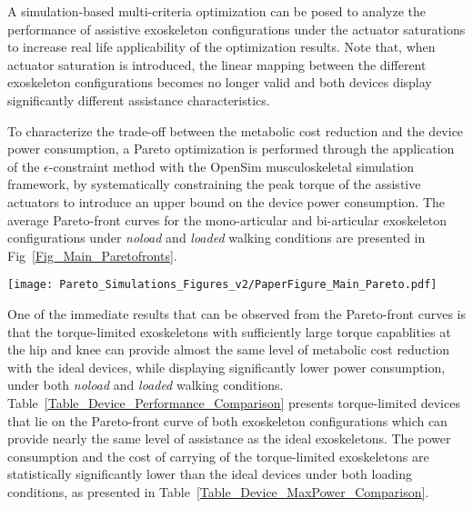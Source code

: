 \documentclass[10pt,letterpaper]{article}
\begin{document}
A simulation-based multi-criteria optimization can be posed to analyze the performance of assistive exoskeleton configurations under the actuator saturations to increase real life applicability of the optimization results. Note that, when actuator saturation is introduced, the linear mapping between the different exoskeleton configurations becomes no longer valid and both devices display significantly different assistance characteristics.

To characterize  the trade-off between  the metabolic cost reduction and the device power consumption, a Pareto optimization is performed through the application of the $\epsilon$-constraint method with the OpenSim musculoskeletal simulation framework, by systematically constraining the peak torque of the assistive actuators to introduce an upper bound on the device power consumption. The average Pareto-front curves for the  mono-articular and bi-articular exoskeleton configurations under \emph{noload} and \emph{loaded} walking conditions are presented in Fig~\ref{Fig_Main_Paretofronts}.

\begin{figure*}[ht]
	\centering
	\texttt{[image: Pareto\_Simulations\_Figures\_v2/PaperFigure\_Main\_Pareto.pdf]}
	\vspace{-4mm}
	\caption{{\small\textbf{Pareto-front curves characterizing the trade-off between metabolic cost reduction and absolute power consumption.} The data points on the Pareto-front curves represent the average and standard deviations over 7 subjects and 3 trials per subjects. The label on each marker denotes results from different peak torque constraints. The hip peak torque constraints are labeled with capital letters from {\it A} to {\it E} to represent the range of torques from 70~Nm to 30~Nm, while the knee peak torque constraints are labeled with lower-case letters from {\it a} to {\it e} to represent the range of torques from 70~Nm to 30~Nm, respectively. }}
	\label{Fig_Main_Paretofronts}
\end{figure*}


One of the immediate results that can be observed from the Pareto-front curves is that the torque-limited exoskeletons with sufficiently large torque capablities at the hip and knee can provide almost the same level of metabolic cost reduction with the ideal devices, while displaying significantly lower power consumption, under both \emph{noload} and \emph{loaded} walking conditions. Table~\ref{Table_Device_Performance_Comparison} presents torque-limited devices that lie on the Pareto-front curve of both exoskeleton configurations which can provide nearly the same level of assistance as the ideal exoskeletons. The power consumption and the cost of carrying of the torque-limited exoskeletons are statistically significantly lower than the ideal devices under both loading conditions, as presented in Table~\ref{Table_Device_MaxPower_Comparison}.
\end{document}
